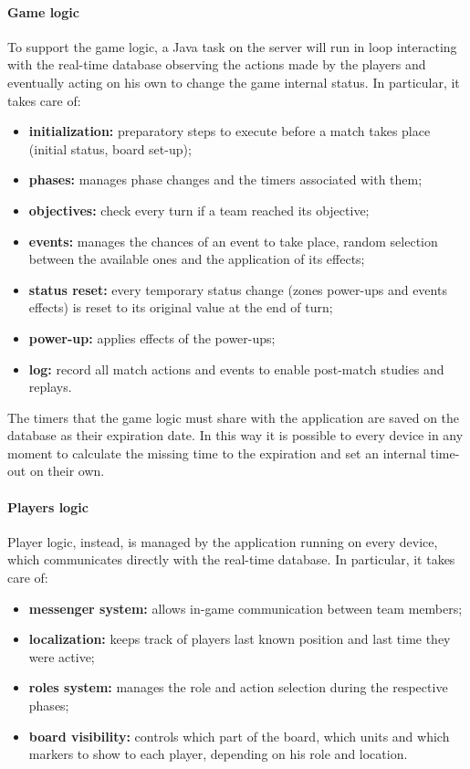 			\paragraph{Game logic}
			
				To support the game logic, a Java task on the server will run in loop interacting with the real-time database observing the actions made by the players and eventually acting on his own to change the game internal status. In particular, it takes care of:
				\begin{itemize}
					\item \textbf{initialization:} preparatory steps to execute before a match takes place (initial status, board set-up);
					\item \textbf{phases:} manages phase changes and the timers associated with them;
					\item \textbf{objectives:} check every turn if a team reached its objective;
					\item \textbf{events:} manages the chances of an event to take place,  random selection between the available ones and the application of its effects;
					\item \textbf{status reset:} every temporary status change (zones power-ups and events effects) is reset to its original value at the end of turn;
					\item \textbf{power-up:} applies effects of the power-ups;
					\item \textbf{log:} record all match actions and events to enable post-match studies and replays.  
				\end{itemize}
				
				The timers that the game logic must share with the application are saved on the database as their expiration date. In this way it is possible to every device in any moment to calculate the missing time to the expiration and set an internal time-out on their own.
			
			\paragraph{Players logic}
			
				Player logic, instead, is managed by the application running on every device, which communicates directly with the real-time database. In particular, it takes care of:
				\begin{itemize}
					\item \textbf{messenger system:} allows in-game communication between team members;
					\item \textbf{localization:} keeps track of players last known position and last time they were active;
					\item \textbf{roles system:} manages the role and action selection during the respective phases;
					\item \textbf{board visibility:} controls which part of the board, which units and which markers to show to each player, depending on his role and location.
				\end{itemize}
			
